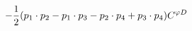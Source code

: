 %
\begin{dmath*}
%
  -  \frac{1}{2}(p_{1}\nobreak\cdot\nobreak{}p_{2} - p_{1}\nobreak\cdot\nobreak{}p_{3} - p_{2}\nobreak\cdot\nobreak{}p_{4} + p_{3}\nobreak\cdot\nobreak{}p_{4}) C^{ \varphi  D}
%
\end{dmath*}
%
